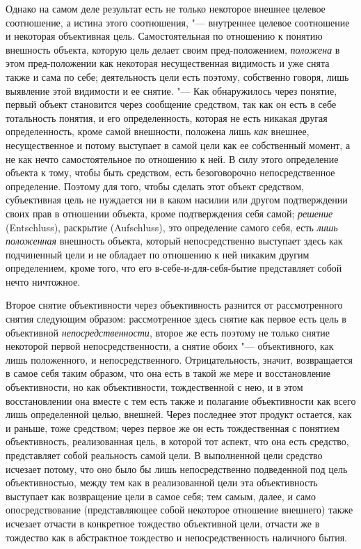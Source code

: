 {{Однако на самом деле результат есть не только некоторое
внешнее целевое соотношение, а истина этого соотношения, "---
внутреннее целевое соотношение и некоторая объективная цель.
Самостоятельная по отношению к понятию внешность объекта, которую цель
делает своим пред-положением,
{\em положена} в этом
пред-положении как некоторая несущественная видимость и уже
снята также и сама по себе; деятельность цели есть поэтому, собственно
говоря, лишь выявление этой видимости и ее снятие. "--- Как
обнаружилось через понятие, первый объект становится через сообщение
средством, так как он есть в себе тотальность понятия, и его
определенность, которая не есть никакая другая определенность, кроме самой
внешности, положена лишь {\em как}
внешнее, несущественное и потому выступает в самой цели как
ее собственный момент, а не как нечто самостоятельное по отношению к ней. В
силу этого определение объекта к тому, чтобы быть средством, есть
безоговорочно непосредственное определение. Поэтому для того, чтобы сделать
этот объект средством, субъективная цель не нуждается ни в каком насилии
или другом подтверждении своих прав в отношении объекта, кроме
подтверждения себя самой; {\em решение}
(Entschluss), раскрытие (Aufschluss), это
определение самого себя, есть {\em лишь
положенная} внешность объекта, который непосредственно
выступает здесь как подчиненный цели и не обладает по отношению к ней
никаким другим определением, кроме того, что его
в-себе-и-для-себя-бытие представляет собой нечто ничтожное.

Второе снятие объективности через объективность разнится от
рассмотренного снятия следующим образом: рассмотренное здесь снятие как
первое есть цель в объективной
{\em непосредственности},
второе же есть поэтому не только снятие некоторой первой
непосредственности, а снятие обоих "--- объективного, как лишь
положенного, и непосредственного. Отрицательность, значит, возвращается в
самое себя таким образом, что она есть в такой же мере и восстановление
объективности, но как объективности, тождественной с нею, и в этом
восстановлении она вместе с тем есть также и полагание объективности как
всего лишь определенной целью, внешней. Через последнее этот продукт
остается, как и раньше, тоже средством; через первое же он есть
тождественная с понятием объективность, реализованная цель, в которой тот
аспект, что она есть средство, представляет собой реальность самой цели. В
выполненной цели средство исчезает потому, что оно было бы лишь
непосредственно подведенной под цель объективностью, между тем как в
реализованной цели эта объективность выступает как возвращение цели в самое
себя; тем самым, далее, и само опосредствование (представляющее собой
некоторое отношение внешнего) также исчезает отчасти в конкретное тождество
объективной цели, отчасти же в тождество как в абстрактное тождество и
непосредственность наличного бытия.

}}
